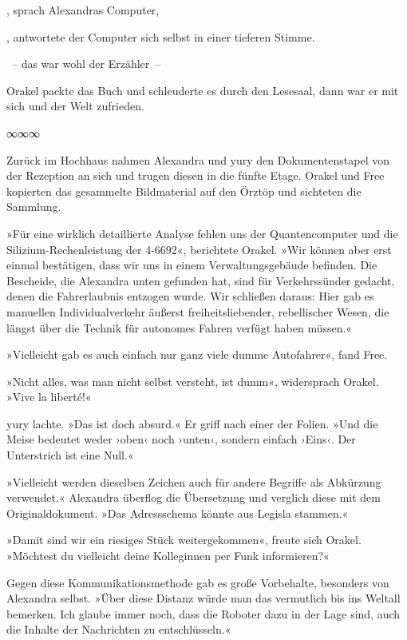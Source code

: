 , sprach Alexandras Computer, 

, antwortete der Computer sich selbst in einer tieferen Stimme.

~– das war wohl der Erzähler~– 

Orakel packte das Buch und schleuderte es durch den Lesesaal, dann war er mit sich und der Welt zufrieden.

\begin{center}
∞∞∞
\end{center}

Zurück im Hochhaus nahmen Alexandra und yury den Dokumentenstapel von der Rezeption an sich und trugen diesen in die fünfte Etage. Orakel und Free kopierten das gesammelte Bildmaterial auf den Örztöp und sichteten die Sammlung.

»Für eine wirklich detaillierte Analyse fehlen uns der Quantencomputer und die Silizium-Rechenleistung der 4-6692«, berichtete Orakel. »Wir können aber erst einmal bestätigen, dass wir uns in einem Verwaltungsgebäude befinden. Die Bescheide, die Alexandra unten gefunden hat, sind für Verkehrssünder gedacht, denen die Fahrerlaubnis entzogen wurde. Wir schließen daraus: Hier gab es manuellen Individualverkehr äußerst freiheitsliebender, rebellischer Wesen, die längst über die Technik für autonomes Fahren verfügt haben müssen.«

»Vielleicht gab es auch einfach nur ganz viele dumme Autofahrer«, fand Free.

»Nicht alles, was man nicht selbst versteht, ist dumm«, widersprach Orakel. »Vive la liberté!«

yury lachte. »Das ist doch absurd.« Er griff nach einer der Folien. »Und die Meise bedeutet weder ›oben‹ noch ›unten‹, sondern einfach ›Eins‹. Der Unterstrich ist eine Null.«

»Vielleicht werden dieselben Zeichen auch für andere Begriffe als Abkürzung verwendet.« Alexandra überflog die Übersetzung und verglich diese mit dem Originaldokument. »Das Adressschema könnte aus Legisla stammen.«

»Damit sind wir ein riesiges Stück weitergekommen«, freute sich Orakel. »Möchtest du vielleicht deine Kolleginnen per Funk informieren?«

Gegen diese Kommunikationsmethode gab es große Vorbehalte, besonders von Alexandra selbst. »Über diese Distanz würde man das vermutlich bis ins Weltall bemerken. Ich glaube immer noch, dass die Roboter dazu in der Lage sind, auch die Inhalte der Nachrichten zu entschlüsseln.«

